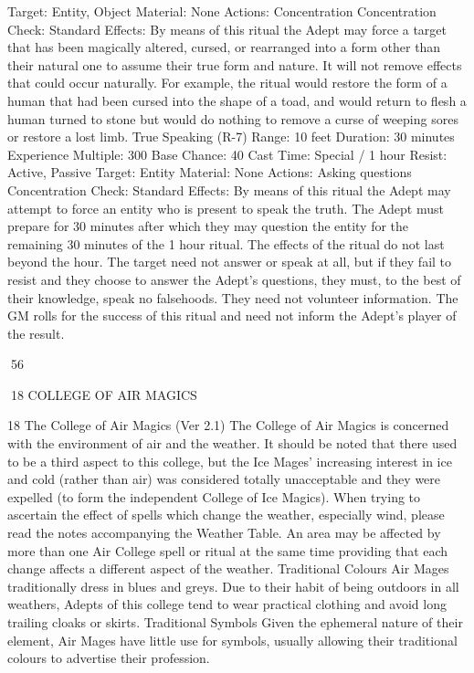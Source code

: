 \documentclass[a4paper]{article}
\begin{document}
\begin{multicols}{3}
Target: Entity, Object
Material: None
Actions: Concentration
Concentration Check: Standard
Effects: By means of this ritual the Adept may
force a target that has been magically altered,
cursed, or rearranged into a form other than their
natural one to assume their true form and nature. It
will not remove effects that could occur naturally.
For example, the ritual would restore the form of a
human that had been cursed into the shape of a
toad, and would return to flesh a human turned to
stone but would do nothing to remove a curse of
weeping sores or restore a lost limb.
True Speaking (R-7)
Range: 10 feet
Duration: 30 minutes
Experience Multiple: 300
Base Chance: 40%
Cast Time: Special / 1 hour
Resist: Active, Passive
Target: Entity
Material: None
Actions: Asking questions
Concentration Check: Standard
Effects: By means of this ritual the Adept may
attempt to force an entity who is present to speak
the truth. The Adept must prepare for 30 minutes
after which they may question the entity for the
remaining 30 minutes of the 1 hour ritual. The
effects of the ritual do not last beyond the hour.
The target need not answer or speak at all, but if
they fail to resist and they choose to answer the
Adept’s questions, they must, to the best of their
knowledge, speak no falsehoods. They need not
volunteer information. The GM rolls for the success of this ritual and need not inform the Adept’s
player of the result.

56

18 COLLEGE OF AIR MAGICS

18 The College of Air Magics (Ver 2.1)
The College of Air Magics is concerned with the
environment of air and the weather. It should be
noted that there used to be a third aspect to this
college, but the Ice Mages’ increasing interest in
ice and cold (rather than air) was considered totally
unacceptable and they were expelled (to form the
independent College of Ice Magics).
When trying to ascertain the effect of spells which
change the weather, especially wind, please read
the notes accompanying the Weather Table. An
area may be affected by more than one Air College
spell or ritual at the same time providing that each
change affects a different aspect of the weather.
Traditional Colours
Air Mages traditionally dress in blues and greys.
Due to their habit of being outdoors in all weathers,
Adepts of this college tend to wear practical clothing and avoid long trailing cloaks or skirts.
Traditional Symbols
Given the ephemeral nature of their element, Air
Mages have little use for symbols, usually allowing
their traditional colours to advertise their profession.


\end{multicols}
\end{document}
